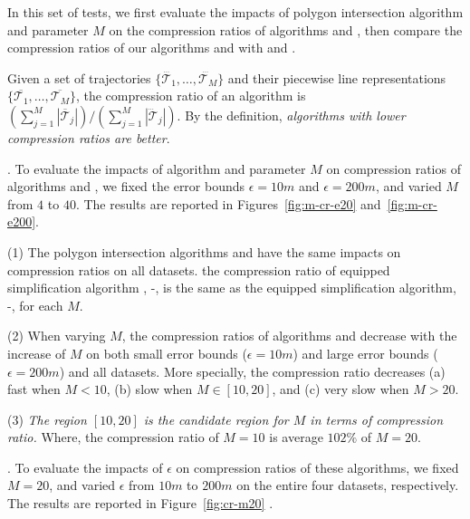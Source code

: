 In this set of tests, we first evaluate the impacts of polygon intersection algorithm \rpia and parameter $M$ on the compression ratios of algorithms \cist and \cista, then compare the compression ratios of our algorithms \cist and \cista with \dpa and \squishe.

Given a set of trajectories $\{\dddot{\mathcal{T}_1}, \ldots, \dddot{\mathcal{T}_M}\}$ and their piecewise line representations $\{\overline{\mathcal{T}_1}, \ldots, \overline{\mathcal{T}_M}\}$, the compression ratio of an algorithm is $(\sum_{j=1}^{M} |\overline{\mathcal{T}}_j |)/(\sum_{j=1}^{M} |\dddot{\mathcal{T}}_j |)$.
By the definition, \emph{algorithms with lower compression ratios are better}.




.
To evaluate the impacts of algorithm \rpia and parameter $M$ on compression ratios of algorithms \cist and \cista, we fixed the error bounds {$\epsilon =10m$} and $\epsilon =200m$, and varied $M$ from $4$ to $40$.
The results are reported in Figures~\ref{fig:m-cr-e20} and~\ref{fig:m-cr-e200}.


\ni(1) The polygon intersection algorithms \rpia and \cpia have the same impacts on compression ratios on all datasets. \eg the compression ratio of \rpia equipped simplification algorithm \cist, \ie \cist-\rpia, is the same as the \cpia equipped simplification algorithm, \ie \cist-\cpia, for each $M$.


\ni(2) When varying $M$, the compression ratios of algorithms \cist and \cista decrease with the increase of $M$ on both small error bounds {(\eg $\epsilon = 10m$)} and large error bounds (\eg $\epsilon = 200m$) and all datasets.
More specially, the compression ratio decreases (a) fast when $M < 10$, (b) slow when $M \in [10, 20]$, and (c) very slow when $M  > 20$.


\ni(3) \emph{The region $[10, 20]$ is the candidate region for $M$ in terms of compression ratio.}
Where, the compression ratio of $M=10$ is average \textcolor[rgb]{1.00,0.00,0.00}{$102\%$} of $M=20$.


.
To evaluate the impacts of $\epsilon$ on compression ratios of these algorithms, we fixed $M=20$, and varied $\epsilon$ from $10m$ to $200m$ on the entire four datasets, respectively.
The results are reported in Figure~\ref{fig:cr-m20} .


